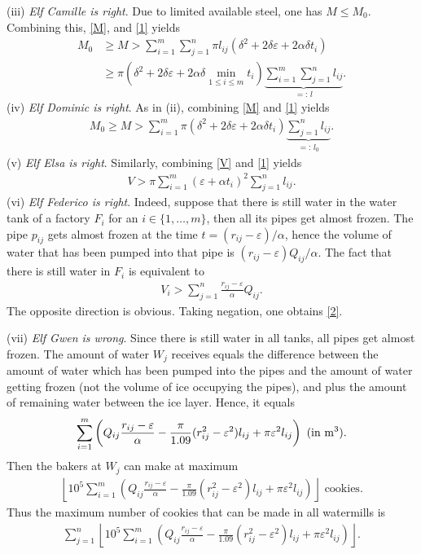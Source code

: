 \documentclass[12pt]{article}
\begin{document}
(iii) \textit{Elf Camille is right}. Due to limited available steel, one has $M\le M_0$. Combining this, \eqref{M}, and \eqref{1} yields
\begin{align*}
M_0&\ge M > \sum_{i=1}^m\sum_{j=1}^n \pi l_{ij}\left(\delta^2 + 2\delta\varepsilon + 2\alpha\delta t_i\right)\\
&\ge\pi\left(\delta^2 + 2\delta\varepsilon + 2\alpha\delta\min_{1\le i\le m} t_i\right)\underbrace{\sum_{i=1}^m\sum_{j=1}^n l_{ij}}_{=:\, l}.
\end{align*}
(iv) \textit{Elf Dominic is right}. As in (ii), combining \eqref{M} and \eqref{1} yields
\begin{align*}
M_0\ge M > \sum_{i=1}^m \pi\left(\delta^2 + 2\delta\varepsilon + 2\alpha\delta t_i\right)\underbrace{\sum_{j=1}^n l_{ij}}_{=:\, l_0}. 
\end{align*}
(v) \textit{Elf Elsa is right}. Similarly, combining \eqref{V} and \eqref{1} yields
\begin{align*}
V > \pi\sum_{i=1}^m (\varepsilon + \alpha t_i)^2\sum_{j=1}^n l_{ij}.
\end{align*}
(vi) \textit{Elf Federico is right}. Indeed, suppose that there is still water in the water tank of a factory $F_i$ for an $i\in \{1,\ldots,m\}$, then all its pipes get almost frozen. The pipe $p_{ij}$ gets almost frozen at the time $t = (r_{ij} - \varepsilon)/\alpha$, hence the volume of water that has been pumped into that pipe is $(r_{ij} - \varepsilon)Q_{ij}/\alpha$. The fact that there is still water in $F_i$ is equivalent to
\begin{align*}
V_i> \sum_{j=1}^n \frac{r_{ij} - \varepsilon}{\alpha}Q_{ij}.
\end{align*}
The opposite direction is obvious. Taking negation, one obtains \eqref{2}. 

(vii) \textit{Elf Gwen is wrong}. Since there is still water in all tanks, all pipes get almost frozen. The amount of water $W_{j}$ receives equals the difference between the amount of water which has been pumped into the pipes and the amount of water getting frozen (not the volume of ice occupying the pipes), and plus the amount of remaining water between the ice layer. Hence, it equals
\begin{align*}
\sum_{i=1}^m \left(Q_{ij}\frac{r_{ij} - \varepsilon}{\alpha} - \frac{\pi}{1.09}(r_{ij}^2 - \varepsilon^2)l_{ij} + \pi\varepsilon^2l_{ij}\right) \mbox{ (in } {\rm m}^3).
\end{align*}
Then the bakers at $W_j$ can make at maximum 
\begin{align*}
\left\lfloor 10^5\sum_{i=1}^m \left(Q_{ij}\frac{r_{ij} - \varepsilon}{\alpha} - \frac{\pi}{1.09}(r_{ij}^2 - \varepsilon^2)l_{ij} + \pi\varepsilon^2l_{ij}\right)\right\rfloor \mbox{ cookies}.
\end{align*}
Thus the maximum number of cookies that can be made in all watermills is
\begin{align*}
\sum_{j=1}^n\left\lfloor 10^5\sum_{i=1}^m \left(Q_{ij}\frac{r_{ij} - \varepsilon}{\alpha} - \frac{\pi}{1.09}(r_{ij}^2 - \varepsilon^2)l_{ij} + \pi\varepsilon^2l_{ij}\right)\right\rfloor.
\end{align*}
\end{document}
